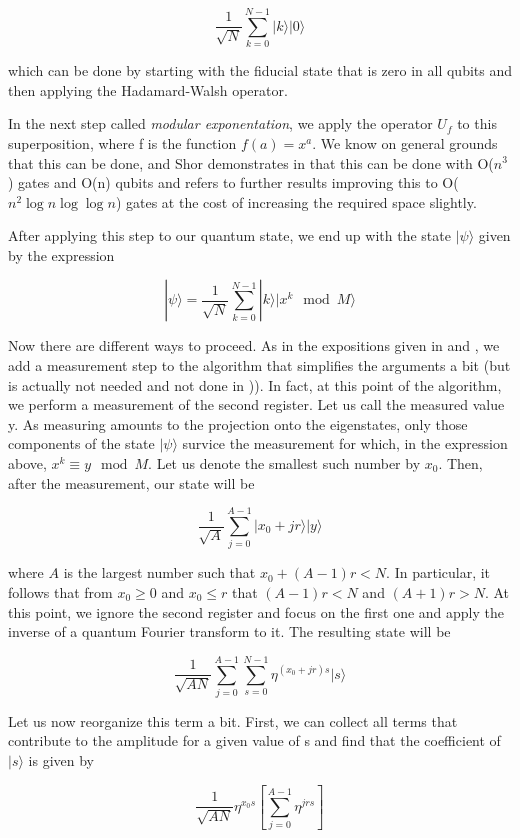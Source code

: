 \documentclass[a4paper, draft]{article}
\theoremstyle{own}
\theoremstyle{remark}
\begin{document}
$$
\frac{1}{\sqrt{N}} \sum_{k=0}^{N-1} |k \rangle  |0\rangle
$$

which can be done by starting with the fiducial state that is zero in all qubits and then applying the Hadamard-Walsh operator.

In the next step called \emph{modular exponentation}, we apply the operator $U_f$ to this superposition, where f is the function $f(a) = x^a$. We know on general grounds that this can be done, and Shor demonstrates in \cite{Shor96} that this can be done with O($n^3$) gates and O(n) qubits and refers to further results improving this to O($n^2 \log n \log \log n$) gates at the cost of increasing the required space slightly.  

After applying this step to our quantum state, we end up with the state $| \psi \rangle$ given by the expression

$$
|\psi \rangle = \frac{1}{\sqrt{N}} \sum_{k=0}^{N-1} |k \rangle  |x^k \mod M \rangle
$$

Now there are different ways to proceed. As in the expositions given in \cite{J} and \cite{P}, we add a measurement step to the algorithm that simplifies the arguments a bit (but is actually not needed and not done in \cite{Shor96})). In fact, at this point of the algorithm, we perform a measurement of the second register. Let us call the measured value y. As measuring amounts to the projection onto the eigenstates, only those components of the state $|\psi \rangle $ survice the measurement for which, in the expression above, $x^k \equiv y \mod M$. Let us denote the smallest such number by $x_0$. Then, after the measurement, our state will be

$$
\frac{1}{\sqrt{A}} \sum_{j=0}^{A-1} |x_0 + jr \rangle  |y \rangle
$$

where $A$ is the largest number such that $x_0 + (A-1)r < N$. In particular, it follows that from $x_0 \geq 0$ and $x_0 \leq r$ that  $(A-1)r < N$ and $(A+1)r > N$.  At this point, we ignore the second register and focus on the first one and apply the inverse of a quantum Fourier transform to it. The resulting state will be

$$
\frac{1}{\sqrt{AN}} \sum_{j=0}^{A-1} \sum_{s=0}^{N-1} \eta^{(x_0 + jr)s} |s \rangle 
$$

Let us now reorganize this term a bit. First, we can collect all terms that contribute to the amplitude for a given value of s and find that the coefficient of $|s \rangle $ is given by

$$
\frac{1}{\sqrt{AN}} \eta^{x_0 s} \left[ \sum_{j=0}^{A-1}  \eta^{jrs} \right] 
$$
\end{document}
